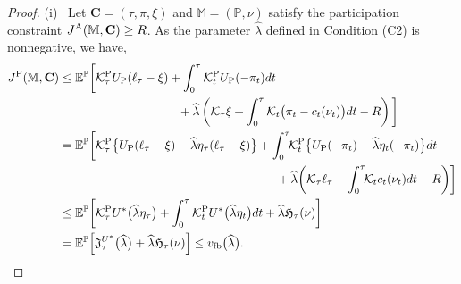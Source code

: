 \documentclass[11pt,a4paper]{article}
\numberwithin{equation}{section}
\def\dbE{\mathbb{E}}
\def\dbM{\mathbb{M}}
\def\dbP{\mathbb{P}}
\newcommand{\cK}{\mathcal{K}}
\theoremstyle{definition}
\begin{document}
\begin{proof}
  (i) \, Let $\mathbf{C}=(\tau,\pi,\xi)$ and $\dbM=(\dbP,\nu)$ satisfy the participation constraint $J^{\rm A}(\dbM,\mathbf{C})\ge R$. 
  As the parameter $\widehat\lambda$ defined in Condition (C2) is nonnegative, we have,
  \allowdisplaybreaks
   \begin{align}
     J^{\rm P}(\dbM,\mathbf{C}) 
         &\leq \dbE^\dbP\bigg[\cK^{\rm P}_{\tau} U_{\rm P}(\ell_\tau-\xi) + \int_0^{\tau}\cK^{\rm P}_t U_{\rm P}(-\pi_t)dt \nonumber \\
         &\hspace{34.5mm} + \widehat\lambda\left(\cK_{\tau}\xi + \int_0^{\tau}\cK_t\big(\pi_t-c_t(\nu_t)\big)dt - R\right)\bigg] \label{ineq:1} \\
         &= \dbE^\dbP\bigg[\cK^{\rm P}_{\tau}\big\{ U_{\rm P}(\ell_\tau-\xi) - \widehat\lambda\eta_{\tau}(\ell_\tau-\xi)\big\} + \int_0^{\tau}\!\!\cK^{\rm P}_t \big\{ U_{\rm P}(-\pi_t) - \widehat\lambda\eta_t(-\pi_t)\big\}dt \nonumber \\
         &\hspace{63mm} +  \widehat\lambda \bigg(\cK_{\tau}\ell_\tau- \int_0^{\tau}\!\!\cK_t c_t(\nu_t)dt - R\bigg) \bigg] \nonumber \\
         &\leq \dbE^\dbP\bigg[\cK^{\rm P}_{\tau} U^*\big(\widehat\lambda\eta_{\tau}\big) + \int_0^\tau\cK^{\rm P}_t U^*\big(\widehat\lambda\eta_t\big)dt + \widehat\lambda\mathfrak{H}_\tau(\nu)\bigg] \label{ineq:2} \\
         &= \dbE^\dbP\Big[\mathfrak{J}^{U^*}_\tau\big(\widehat\lambda\big) + \widehat\lambda \mathfrak{H}_\tau(\nu)\Big] \leq v_{\rm fb}\big(\widehat\lambda\big).  \label{ineq:3}
   \end{align}

\end{proof}
\end{document}

